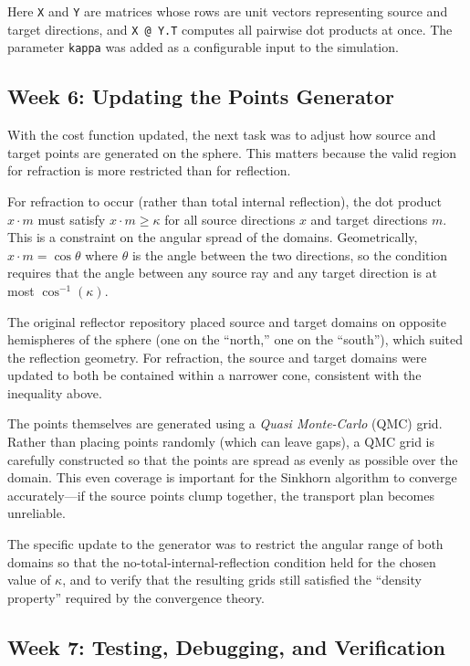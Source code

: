\documentclass{article}
\begin{document}
Here \texttt{X} and \texttt{Y} are matrices whose rows are unit vectors representing
source and target directions, and \texttt{X @ Y.T} computes all pairwise dot products
at once. The parameter \texttt{kappa} was added as a configurable input to the
simulation.

\subsection{Week 6: Updating the Points Generator}

With the cost function updated, the next task was to adjust how source and target points
are generated on the sphere. This matters because the valid region for refraction is
more restricted than for reflection.

For refraction to occur (rather than total internal reflection), the dot product $x \cdot m$
must satisfy $x \cdot m \geq \kappa$ for all source directions $x$ and target directions
$m$. This is a constraint on the angular spread of the domains. Geometrically, $x \cdot m
= \cos\theta$ where $\theta$ is the angle between the two directions, so the condition
requires that the angle between any source ray and any target direction is at most
$\cos^{-1}(\kappa)$.

The original reflector repository placed source and target domains on opposite hemispheres
of the sphere (one on the ``north,'' one on the ``south''), which suited the reflection
geometry. For refraction, the source and target domains were updated to both be contained
within a narrower cone, consistent with the inequality above.

The points themselves are generated using a \emph{Quasi Monte-Carlo} (QMC) grid. Rather
than placing points randomly (which can leave gaps), a QMC grid is carefully constructed
so that the points are spread as evenly as possible over the domain. This even coverage
is important for the Sinkhorn algorithm to converge accurately---if the source points
clump together, the transport plan becomes unreliable.

The specific update to the generator was to restrict the angular range of both domains
so that the no-total-internal-reflection condition held for the chosen value of $\kappa$,
and to verify that the resulting grids still satisfied the ``density property'' required
by the convergence theory.

\subsection{Week 7: Testing, Debugging, and Verification}
\end{document}

